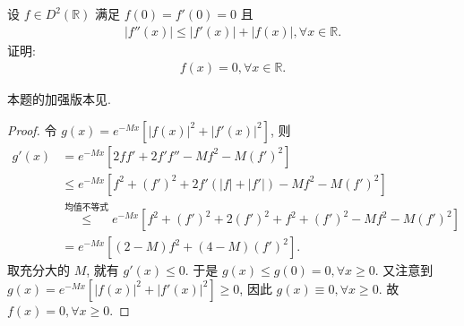 \documentclass[../../main.tex]{subfiles}%
\begin{document}
\begin{example}
设 $f\in D^2(\mathbb{R})$ 满足 $f(0)=f'(0)=0$ 且
\begin{align*}
|f''(x)|\leqslant|f'(x)|+|f(x)|,\forall x\in\mathbb{R}.
\end{align*}
证明:
\begin{align*}
f(x)=0,\forall x\in\mathbb{R}.
\end{align*} 
\end{example}
\begin{note}
本题的加强版本见.
\end{note}
\begin{proof}
令 $g(x)=e^{-Mx}\left[|f(x)|^2+|f'(x)|^2\right]$, 则
\begin{align*}
g'(x)&=e^{-Mx}\left[2ff'+2f'f''-Mf^2-M(f')^2\right]\\
&\leqslant e^{-Mx}\left[f^2+(f')^2+2f'\left(|f|+|f'|\right)-Mf^2-M(f')^2\right]\\
&\overset{\text{均值不等式}}{\leqslant} e^{-Mx}\left[f^2+(f')^2+2(f')^2+f^2+(f')^2-Mf^2-M(f')^2\right]\\
&=e^{-Mx}\left[(2 - M)f^2+(4 - M)(f')^2\right].
\end{align*}
取充分大的 $M$, 就有 $g'(x)\leqslant0$. 于是 $g(x)\leqslant g(0)=0,\forall x\geqslant0$.
又注意到 $g(x)=e^{-Mx}\left[|f(x)|^2+|f'(x)|^2\right]\geqslant0$, 因此 $g(x)\equiv0,\forall x\geqslant0$.
故 $f(x)=0,\forall x\geqslant0$. \end{proof}
\end{document}
